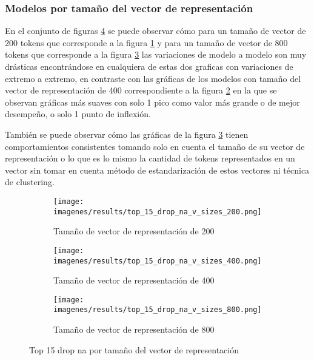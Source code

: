 \documentclass[12pt]{article}
\begin{document}
		
		\subsubsection{Modelos por tamaño del vector de representación}
		\label{sec:x_tamaño_representación}
		En el conjunto de figuras \ref{fig:by_v_sizes} se puede observar cómo para un tamaño de vector de 200 tokens que corresponde a la figura \ref{fig:v_sizes_200} y para un tamaño de vector de 800 tokens que corresponde a la figura \ref{fig:v_sizes_800} las variaciones de modelo a modelo son muy drásticas encontrándose en cualquiera de estas dos graficas con variaciones de extremo a extremo, en contraste con las gráficas de los modelos con tamaño del vector de representación de 400 correspondiente a la figura \ref{fig:v_sizes_400} en la que se observan gráficas más suaves con solo 1 pico como valor más grande o de mejor desempeño, o solo 1 punto de inflexión.
		
		También se puede observar cómo las gráficas de la figura \ref{fig:v_sizes_800} tienen comportamientos consistentes tomando solo en cuenta el tamaño de su vector de representación o lo que es lo mismo la cantidad de tokens representados en un vector sin tomar en cuenta método de estandarización de estos vectores ni técnica de clustering.
			\begin{figure}[htp]
			\centering\begin{subfigure}[b]{0.5\linewidth} 
				\centering\texttt{[image: imagenes/results/top\_15\_drop\_na\_v\_sizes\_200.png]} 
				\caption{\label{fig:v_sizes_200}Tamaño de vector de representación de 200} 
			\end{subfigure}\hfill
			\begin{subfigure}[b]{0.5\linewidth} 
				\centering\texttt{[image: imagenes/results/top\_15\_drop\_na\_v\_sizes\_400.png]} 
				\caption{\label{fig:v_sizes_400}Tamaño de vector de representación de 400} 
			\end{subfigure}\vspace{10pt}
			
			\begin{subfigure}[b]{\linewidth} 
				\centering\texttt{[image: imagenes/results/top\_15\_drop\_na\_v\_sizes\_800.png]} 
				\caption{\label{fig:v_sizes_800}Tamaño de vector de representación de 800} 
			\end{subfigure} 
			\caption{Top 15 drop na por tamaño del vector de representación} 
			\label{fig:by_v_sizes}
			\end{figure}
				
\end{document}
